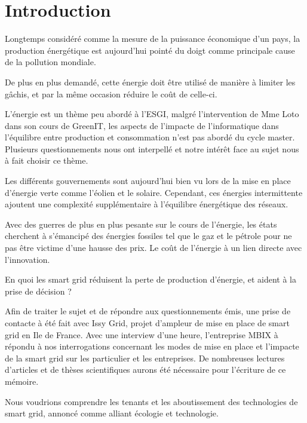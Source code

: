 \chapter*{Introduction}

Longtemps considéré comme la mesure de la puissance économique d'un pays,
la production énergétique est aujourd'hui pointé du doigt comme principale
cause de la pollution mondiale.

De plus en plus demandé, cette énergie doit être utilisé de manière à limiter les gâchis,
et par la même occasion réduire le coût de celle-ci.


L'énergie est un thème peu abordé à l'ESGI, malgré l'intervention de Mme Loto dans son cours de GreenIT, les
aspects de l'impacte de l'informatique dans l'équilibre entre production et consommation n'est pas abordé
du cycle master. Plusieurs questionnements nous ont interpellé et notre intérêt face au sujet
nous à fait choisir ce thème.

Les différents gouvernements sont aujourd'hui bien vu lors de la mise en place
d'énergie verte comme l'éolien et le solaire. Cependant, ces énergies intermittente ajoutent
une complexité supplémentaire à l'équilibre énergétique des réseaux.

Avec des guerres de plus en plus pesante sur le cours de l'énergie, les états cherchent à s'émancipé
des énergies fossiles tel que le gaz et le pétrole pour ne pas être victime d'une hausse des prix.
Le coût de l'énergie à un lien directe avec l'innovation.


En quoi les smart grid réduisent la perte de production d'énergie, et aident à la
prise de décision ?

Afin de traiter le sujet et de répondre aux questionnements émis, une prise de contacte à été fait
avec Issy Grid, projet d'ampleur de mise en place de smart grid en Ile de France.
Avec une interview d'une heure, l'entreprise MBIX à répondu à nos interrogations concernant les modes
de mise en place et l'impacte de la smart grid sur les particulier et les entreprises.
De nombreuses lectures d'articles et de thèses scientifiques aurons été nécessaire
pour l'écriture de ce mémoire.

Nous voudrions comprendre les tenants et les aboutissement des technologies de smart grid, annoncé comme
alliant écologie et technologie.

